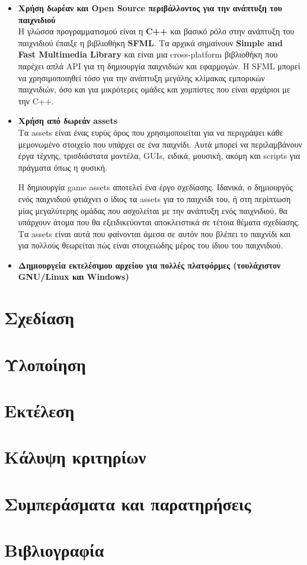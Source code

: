 \documentclass[12pt]{article}
\begin{document}
	\begin{itemize}
		\item \textbf{Χρήση δωρέαν και Open Source περιβάλλοντος για την ανάπτυξη του παιχνιδιού}\\
		Η γλώσσα προγραμματισμού είναι η \textbf{C++} και βασικό ρόλο στην ανάπτυξη του παιχνιδιού έπαιξε η βιβλιοθήκη \textbf{SFML}. Τα αρχικά σημαίνουν \textbf{Simple and Fast Multimedia Library} και είναι μια cross-platform βιβλιοθήκη που παρέχει απλά API για τη δημιουργία παιχνιδιών και εφαρμογών. Η SFML μπορεί να χρησιμοποιηθεί τόσο για την ανάπτυξη μεγάλης κλίμακας εμπορικών παιχνιδιών, όσο και για μικρότερες ομάδες και χομπίστες που είναι αρχάριοι με την C++.
		
		\item \textbf{Χρήση από δωρεάν assets}\\
		Τα assets είναι ένας ευρύς όρος που χρησιμοποιείται για να περιγράψει κάθε μεμονωμένο στοιχείο που υπάρχει σε ένα παιχνίδι. Αυτά μπορεί να περιλαμβάνουν έργα τέχνης, τρισδιάστατα μοντέλα, GUIs, ειδικά, μουσική, ακόμη και scripts για πράγματα όπως η φυσική.
		
		Η δημιουργία game assets αποτελεί ένα έργο σχεδίασης. Ιδανικά, ο δημιουργός ενός παιχνιδιού φτιάχνει ο ίδιος τα assets για το παιχνίδι του, ή στη περίπτωση μίας μεγαλύτερης ομάδας που ασχολείται με την ανάπτυξη ενός παιχνιδιού, θα υπάρχουν άτομα που θα εξειδικεύονται αποκλειστικά σε τέτοια θέματα σχεδίασης. Τα assets είναι αυτά που φαίνονται άμεσα σε αυτόν που βλέπει το παιχνίδι και για πολλούς θεωρείται πώς είναι στοιχειώδης μέρος του ίδιου του παιχνιδιού. 
		
		
		\item \textbf{Δημιουργεία εκτελέσιμου αρχείου για πολλές πλατφόρμες (τουλάχιστον GNU/Linux και Windows)}\\
		
		
		
	\end{itemize}
	
	
	
	
	
	\section{Σχεδίαση}
	
	\section{Υλοποίηση}
	
	\section{Εκτέλεση}
	
	\section{Κάλυψη κριτηρίων}
	
	\section{Συμπεράσματα και παρατηρήσεις}
	
	\section{Βιβλιογραφία}

	
	
	
\end{document}
